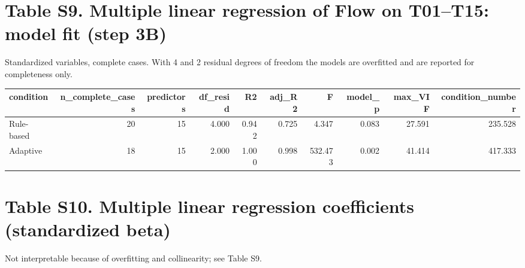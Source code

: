 \documentclass[10pt]{article}
\begin{document}
\section*{Table S9. Multiple linear regression of Flow on T01--T15: model fit (step 3B)}
Standardized variables, complete cases. With 4 and 2 residual degrees of freedom the models are overfitted and are reported for completeness only.

{\scriptsize\setlength{\tabcolsep}{3pt}\begin{longtable}{lrrrrrrrrr}
\toprule
condition & n\_complete\_cases & predictors & df\_resid & R2 & adj\_R2 & F & model\_p & max\_VIF & condition\_number \\
\midrule
\endhead
Rule-based & 20 & 15 & 4.000 & 0.942 & 0.725 & 4.347 & 0.083 & 27.591 & 235.528 \\
Adaptive & 18 & 15 & 2.000 & 1.000 & 0.998 & 532.473 & 0.002 & 41.414 & 417.333 \\
\bottomrule
\end{longtable}}

\section*{Table S10. Multiple linear regression coefficients (standardized beta)}
Not interpretable because of overfitting and collinearity; see Table S9.
\end{document}
